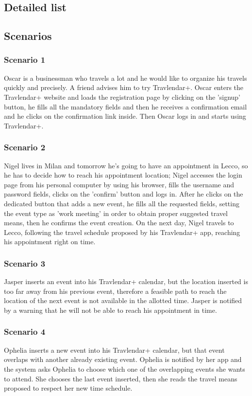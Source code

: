 \subsection{Detailed list}
\label{subsect:Detailed list}


\subsection{Scenarios}
\label{subsect:Scenarios}
	\subsubsection{Scenario 1}
		Oscar is a businessman who travels a lot and he would like to organize his travels quickly and precisely. A friend advises him to try Travlendar+. Oscar enters the Travlendar+ website and loads the registration page by clicking on the 'signup' button, he fills all the mandatory fields and then he receives a confirmation email and he clicks on the confirmation link inside.
Then Oscar logs in and starts using Travlendar+.
	\subsubsection{Scenario 2}
		Nigel lives in Milan and tomorrow he’s going to have an appointment in Lecco, so he has to decide how to reach his appointment location; Nigel accesses the login page from his personal computer by using his browser, fills the username and password fields, clicks on the 'confirm' button and logs in. After he clicks on the dedicated button that adds a new event, he fills all the requested fields, setting the event type as 'work meeting' in order to obtain proper suggested travel means, then he confirms the event creation. On the next day, Nigel travels to Lecco, following the travel schedule proposed by his Travlendar+ app, reaching his appointment right on time.
	\subsubsection{Scenario 3}
		Jasper inserts an event into his Travlendar+ calendar, but the location inserted is too far away from his previous event, therefore a feasible path to reach the location of the next event is not available in the allotted time. Jasper is notified by a warning that he will not be able to reach his appointment in time.	
	\subsubsection{Scenario 4}
		Ophelia inserts a new event into his Travlendar+ calendar, but that event overlaps with another already existing event. Ophelia is notified by her app and the system asks Ophelia to choose which one of the overlapping events she wants to attend. She chooses the last event inserted, then she reads the travel means proposed to respect her new time schedule.
